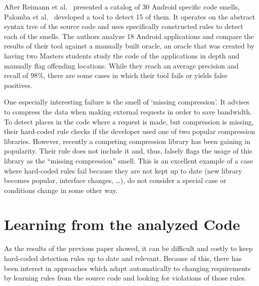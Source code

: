 After Reimann et al.~\cite{reimann2014tool} presented a catalog of 30 Android specific code smells, Palomba et al.~\cite{palomba2017lightweight} developed a tool to detect 15 of them.
It operates on the abstract syntax tree of the source code and uses specifically constructed rules to detect each of the smells.
The authors analyze 18 Android applications and compare the results of their tool against a manually built oracle,
an oracle that was created by having two Masters students study the code of the applications in depth and manually flag offending locations.
While they reach an average precision and recall of 98\%, there are some cases in which their tool fails or yields false positives.

One especially interesting failure is the smell of `missing compression'.
It advises to compress the data when making external requests in order to save bandwidth.
To detect places in the code where a request is made, but compression is missing, their hard-coded rule checks if the developer used one of two popular compression libraries.
However, recently a competing compression library has been gaining in popularity.
Their rule does not include it and, thus, falsely flags the usage of this library as the ``missing compression'' smell.
This is an excellent example of a case where hard-coded rules fail because they are not kept up to date (new library becomes popular, interface changes, \ldots), do not consider a special case or conditions change in some other way.

\section{Learning from the analyzed Code}

As the results of the previous paper showed, it can be difficult and costly to keep hard-coded detection rules up to date and relevant.
Because of this, there has been interest in approaches which adapt automatically to changing requirements by learning rules from the source code and looking for violations of those rules.

